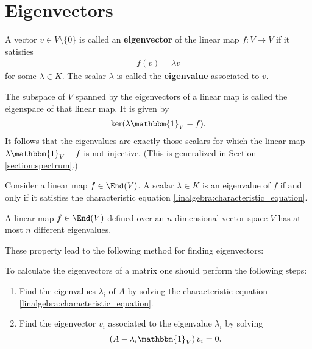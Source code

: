 \section{Eigenvectors}

    \begin{definition}[Eigenvector]
        A vector $v\in V\setminus\{0\}$ is called an \textbf{eigenvector} of the linear map $f:V\rightarrow V$ if it satisfies
       \begin{gather}
            f(v) = \lambda v
        \end{gather}
       for some $\lambda\in K$. The scalar $\lambda$ is called the \textbf{eigenvalue} associated to $v$.
    \end{definition}
    \begin{definition}[Eigenspace]\label{linalgebra:eigenvalue_remark}
        The subspace of $V$ spanned by the eigenvectors of a linear map is called the eigenspace of that linear map. It is given by
        \begin{gather}
            \ker(\lambda\mathbbm{1}_V - f).
        \end{gather}
        It follows that the eigenvalues are exactly those scalars for which the linear map $\lambda\mathbbm{1}_V-f$ is not injective. (This is generalized in Section \ref{section:spectrum}.)
    \end{definition}

    \begin{property}\label{linalgebra:eigenvalue_characteristic_equation}
        Consider a linear map $f\in\End(V)$. A scalar $\lambda\in K$ is an eigenvalue of $f$ if and only if it satisfies the characteristic equation \eqref{linalgebra:characteristic_equation}.
    \end{property}
    \begin{property}
        A linear map $f\in\End(V)$ defined over an $n$-dimensional vector space $V$ has at most $n$ different eigenvalues.
    \end{property}

    These property lead to the following method for finding eigenvectors:
    \begin{method}
        To calculate the eigenvectors of a matrix one should perform the following steps:
        \begin{enumerate}
            \item Find the eigenvalues $\lambda_i$ of $A$ by solving the characteristic equation \eqref{linalgebra:characteristic_equation}.
            \item Find the eigenvector $v_i$ associated to the eigenvalue $\lambda_i$ by solving
                \begin{gather}
                    \label{linalgebra:eigenspace}
                    \left(A - \lambda_i\mathbbm{1}_V\right)v_i = 0.
                \end{gather}
        \end{enumerate}
    \end{method}

